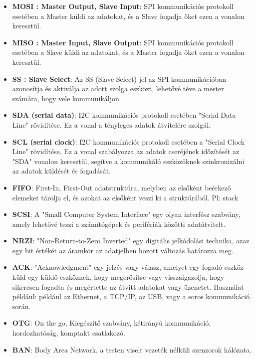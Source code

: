 \begin{itemize}
    \item \textbf{MOSI : Master Output, Slave Input}: SPI kommunikációs protokoll esetében a Master küldi az adatokat, és a Slave fogadja őket ezen a vonalon keresztül.
    \item \textbf{MISO : Master Input, Slave Output}: SPI kommunikációs protokoll esetében a Slave küldi az adatokat, és a Master fogadja őket ezen a vonalon keresztül.
    \item \textbf{SS : Slave Select}: Az SS (Slave Select) jel az SPI kommunikációban azonosítja és aktiválja az adott szolga eszközt, lehetővé téve a mester számára, hogy vele kommunikáljon.
    \item \textbf{SDA (serial data)}: I2C kommunikációs protokoll esetében "Serial Data Line" rövidítése. Ez a vonal a tényleges adatok átvitelére szolgál.
    \item \textbf{SCL (serial clock)}: I2C kommunikációs protokoll esetében a "Serial Clock Line" rövidítése. Ez a vonal szabályozza az adatok cseréjének időzítését az "SDA" vonalon keresztül, segítve a kommunikáló eszközöknek szinkronizálni az adatok küldését és fogadását.
    \item \textbf{FIFO}: First-In, First-Out adatstruktúra, melyben az elsőként beérkező elemeket tárolja el, és azokat az elsőként veszi ki a struktúrából. Pl: stack
    \item \textbf{SCSI}: A "Small Computer System Interface" egy olyan interfész szabvány, amely lehetővé teszi a számítógépek és perifériák közötti adatátvitelt.
    \item \textbf{NRZI}: "Non-Return-to-Zero Inverted" egy digitális jelkódolási technika, azaz egy bit értékét az áramkör az adatjelben hozott változás határozza meg.
    \item \textbf{ACK}: "Acknowledgment" egy jelzés vagy válasz, amelyet egy fogadó eszköz küld egy küldő eszköznek, hogy megerősítse vagy visszaigazolja, hogy sikeresen fogadta és megértette az átvitt adatokat vagy üzenetet. Használat például: például az Ethernet, a TCP/IP, az USB, vagy a soros kommunikáció során.
    \item \textbf{OTG}: On the go, Kiegészítő szabvány, kétirányú kommunikáció, hordozhatóság, komptakt csatlakozó.
    \item \textbf{BAN}: Body Area Network, a testen viselt vezeték nélküli szenzorok hálózata.
\end{itemize}
